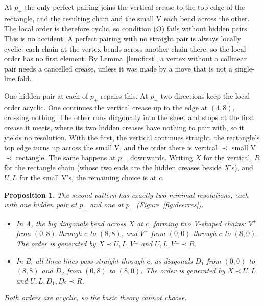 \documentclass[11pt]{article}
\newtheorem{proposition}[theorem]{Proposition}
\theoremstyle{definition}
\theoremstyle{remark}
\begin{document}
At $p_+$ the only perfect pairing joins the vertical crease to the top edge of the rectangle, and the resulting chain and the small V each bend across the other. The local order is therefore cyclic, so condition (O) fails without hidden pairs. This is no accident. A perfect pairing with no straight pair is always locally cyclic: each chain at the vertex bends across another chain there, so the local order has no first element. By Lemma~\ref{lem:first}, a vertex without a collinear pair needs a cancelled crease, unless it was made by a move that is not a single-line fold.

One hidden pair at each of $p_\pm$ repairs this. At $p_+$ two directions keep the local order acyclic. One continues the vertical crease up to the edge at $(4,8)$, crossing nothing. The other runs diagonally into the sheet and stops at the first crease it meets, where its two hidden creases have nothing to pair with, so it yields no resolution. With the first, the vertical continues straight, the rectangle's top edge turns up across the small V, and the order there is vertical $\prec$ small V $\prec$ rectangle. The same happens at $p_-$, downwards. Writing $X$ for the vertical, $R$ for the rectangle chain (whose two ends are the hidden creases beside $X$'s), and $U,L$ for the small V's, the remaining choice is at $c$.

\begin{proposition}\label{prop:deer}
The second pattern has exactly two minimal resolutions, each with one hidden pair at $p_+$ and one at $p_-$ (Figure~\ref{fig:deerres}).
\begin{itemize}
\item In \emph{A}, the big diagonals bend across $X$ at $c$, forming two V-shaped chains: $V^+$ from $(0,8)$ through $c$ to $(8,8)$, and $V^-$ from $(0,0)$ through $c$ to $(8,0)$. The order is generated by $X\prec U,L,V^\pm$ and $U,L,V^\pm\prec R$.
\item In \emph{B}, all three lines pass straight through $c$, as diagonals $D_1$ from $(0,0)$ to $(8,8)$ and $D_2$ from $(0,8)$ to $(8,0)$. The order is generated by $X\prec U,L$ and $U,L,D_1,D_2\prec R$.
\end{itemize}
Both orders are acyclic, so the basic theory cannot choose.
\end{proposition}
\end{document}
